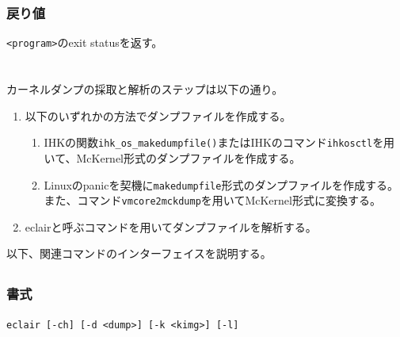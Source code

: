 \documentclass[twoside,11pt,fleqn]{book}
\begin{document}
\subsubsection*{戻り値}{\quad}
\texttt{<program>}のexit statusを返す。

\section{}
カーネルダンプの採取と解析のステップは以下の通り。
\begin{enumerate}
\item 以下のいずれかの方法でダンプファイルを作成する。
\begin{enumerate}
\item IHKの関数\texttt{ihk\_os\_makedumpfile()}またはIHKのコマンド\texttt{ihkosctl}を用いて、McKernel形式のダンプファイルを作成する。
\item Linuxのpanicを契機に\texttt{makedumpfile}形式のダンプファイルを作成する。また、コマンド\texttt{vmcore2mckdump}を用いてMcKernel形式に変換する。
\end{enumerate}
\item eclairと呼ぶコマンドを用いてダンプファイルを解析する。
\end{enumerate}
%
以下、関連コマンドのインターフェイスを説明する。

\subsection{}\label{sec:eclair_gaibu}
\subsubsection*{書式}{\quad} \texttt{eclair [-ch] [-d <dump>] [-k <kimg>] }\MODJULTWO{\texttt{[-o <os\_index>] }}\texttt{[-l] }\MODJULTWO{\texttt{[-i]}}
\end{document}
